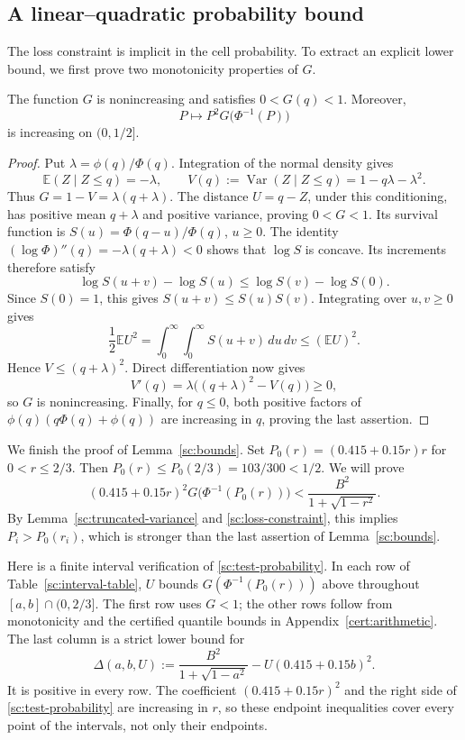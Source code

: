 \subsection{A linear--quadratic probability bound}
The loss constraint is implicit in the cell probability. To extract
an explicit lower bound, we first prove two monotonicity properties
of \(G\).
\begin{lemma}\label{sc:truncated-variance}
The function \(G\) is nonincreasing and satisfies \(0<G(q)<1\).
Moreover,
\[
 P\longmapsto P^2G\bigl(\Phi^{-1}(P)\bigr)
\]
is increasing on \((0,1/2]\).
\end{lemma}
\begin{proof}
Put \(\lambda=\phi(q)/\Phi(q)\). Integration of the normal density gives
\[
 \mathbb E(Z\mid Z\le q)=-\lambda,\qquad
 V(q):=\operatorname{Var}(Z\mid Z\le q)=1-q\lambda-\lambda^2.
\]
Thus \(G=1-V=\lambda(q+\lambda)\). The distance
\(U=q-Z\), under this conditioning, has positive mean
\(q+\lambda\) and positive variance, proving \(0<G<1\).
Its survival function is
\(S(u)=\Phi(q-u)/\Phi(q)\), \(u\ge0\).
The identity
\((\log\Phi)''(q)=-\lambda(q+\lambda)<0\)
shows that \(\log S\) is concave. Its increments therefore satisfy
\[
 \log S(u+v)-\log S(u)\le\log S(v)-\log S(0).
\]
Since \(S(0)=1\), this gives \(S(u+v)\le S(u)S(v)\).
Integrating over \(u,v\ge0\) gives
\[
 \frac12\mathbb EU^2
 =\int_0^\infty\!\int_0^\infty S(u+v)\,du\,dv
 \le(\mathbb EU)^2.
\]
Hence \(V\le(q+\lambda)^2\). Direct differentiation now gives
\[
 V'(q)=\lambda\bigl((q+\lambda)^2-V(q)\bigr)\ge0,
\]
so \(G\) is nonincreasing.
Finally, for \(q\le0\), both positive factors of
\(\phi(q)(q\Phi(q)+\phi(q))\) are increasing in \(q\), proving the
last assertion.
\end{proof}

We finish the proof of Lemma~\ref{sc:bounds}. Set
\(P_0(r)=(0.415+0.15r)r\) for \(0<r\le2/3\). Then
\(P_0(r)\le P_0(2/3)=103/300<1/2\).
We will prove
\begin{equation}\label{sc:test-probability}
 (0.415+0.15r)^2G\bigl(\Phi^{-1}(P_0(r))\bigr)
 <\frac{B^2}{1+\sqrt{1-r^2}}.
\end{equation}
By Lemma~\ref{sc:truncated-variance} and
\eqref{sc:loss-constraint}, this implies \(P_i>P_0(r_i)\), which is
stronger than the last assertion of Lemma~\ref{sc:bounds}.

Here is a finite interval verification of \eqref{sc:test-probability}.
In each row of Table~\ref{sc:interval-table}, \(U\) bounds
\(G(\Phi^{-1}(P_0(r)))\) above throughout \([a,b]\cap(0,2/3]\).
The first row uses \(G<1\); the other rows follow from monotonicity and
the certified quantile bounds in Appendix~\ref{cert:arithmetic}.
The last column is a strict lower bound for
\[
 \Delta(a,b,U):=
 \frac{B^2}{1+\sqrt{1-a^2}}-U(0.415+0.15b)^2.
\]
It is positive in every row. The coefficient \((0.415+0.15r)^2\)
and the right side of \eqref{sc:test-probability} are increasing in
\(r\), so these endpoint inequalities cover every point of the
intervals, not only their endpoints.

